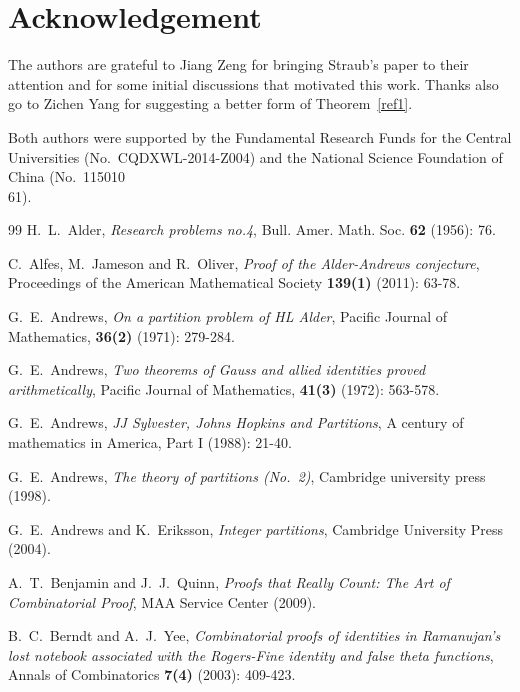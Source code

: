 \documentclass[12pt]{amsart}
\numberwithin{equation}{section}
\theoremstyle{plain}
\theoremstyle{definition}
\begin{document}
\section*{Acknowledgement}

The authors are grateful to Jiang Zeng for bringing Straub's paper \cite{Str} to their attention and for some initial discussions that motivated this work. Thanks also go to Zichen Yang for suggesting a better form of Theorem~\ref{ref1}.



Both authors were supported by the Fundamental Research Funds for the Central Universities (No.~CQDXWL-2014-Z004) and the National Science Foundation of China (No.~115010\\61).

\begin{thebibliography}{99}
H.~L.~Alder, \emph{Research problems no.4}, Bull. Amer. Math. Soc. {\bf 62} (1956): 76.

C.~Alfes, M.~Jameson and R.~Oliver, \emph{Proof of the Alder-Andrews conjecture}, Proceedings of the American Mathematical Society {\bf 139(1)} (2011): 63-78.





G.~E.~Andrews, \emph{On a partition problem of HL Alder}, Pacific Journal of Mathematics, {\bf 36(2)} (1971): 279-284.

G.~E.~Andrews, \emph{Two theorems of Gauss and allied identities proved arithmetically}, Pacific Journal of Mathematics, {\bf 41(3)} (1972): 563-578.

G.~E.~Andrews, \emph{JJ Sylvester, Johns Hopkins and Partitions}, A century of mathematics in America, Part I (1988): 21-40.

G.~E.~Andrews, \emph{The theory of partitions (No.~2)}, Cambridge university press (1998).

G.~E.~Andrews and K.~Eriksson, \emph{Integer partitions}, Cambridge University Press (2004).




A.~T.~Benjamin and J.~J.~Quinn, \emph{Proofs that Really Count: The Art of Combinatorial Proof}, MAA Service Center (2009).

B.~C.~Berndt and A.~J.~Yee, \emph{Combinatorial proofs of identities in Ramanujan's lost notebook associated with the Rogers-Fine identity and false theta functions}, Annals of Combinatorics {\bf 7(4)} (2003): 409-423.




\end{thebibliography}
\end{document}
